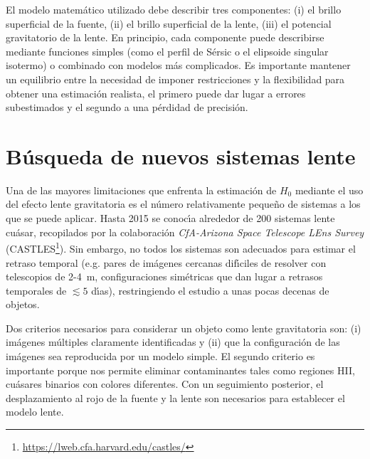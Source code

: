 \documentclass[baaa]{baaa}
\begin{document}
El modelo matem\'atico utilizado debe describir tres componentes: (i) el brillo superficial de la fuente, (ii) el brillo superficial de la lente, (iii) el potencial gravitatorio de la lente. En principio, cada componente puede describirse mediante funciones simples (como el perfil de S\'ersic o el elipsoide singular isotermo) o combinado con modelos m\'as complicados.  
Es importante mantener un equilibrio entre la necesidad de imponer restricciones y la flexibilidad para obtener una estimaci\'on realista, el primero puede dar lugar a errores subestimados y el segundo a una p\'erdidad de precisi\'on.



\section{B\'usqueda de nuevos sistemas lente}

Una de las mayores limitaciones que enfrenta la estimaci\'on de $H_0$ mediante el uso del efecto lente gravitatoria es el n\'umero relativamente peque\~no de sistemas a los que se puede aplicar. Hasta 2015 se conoc\'{\i}a alrededor de 200 sistemas lente cu\'asar, recopilados por la colaboraci\'on {\em CfA-Arizona Space Telescope LEns Survey} (CASTLES\footnote{\url{https://lweb.cfa.harvard.edu/castles/}}). Sin embargo, no todos los sistemas son adecuados para estimar el retraso temporal (e.g. pares de im\'agenes cercanas dif\'{\i}ciles de resolver con telescopios de 2-4~m, configuraciones sim\'etricas que dan lugar a retrasos temporales de $\lesssim 5$ d\'{\i}as), restringiendo el estudio a unas pocas decenas de objetos. 

Dos criterios necesarios para considerar un objeto como lente gravitatoria son: (i) im\'agenes m\'ultiples claramente identificadas y (ii) que la configuraci\'on de las im\'agenes sea reproducida por un modelo simple. El segundo criterio es importante porque nos permite eliminar contaminantes tales como regiones HII, cu\'asares binarios con colores diferentes.  Con un seguimiento posterior, el desplazamiento al rojo de la fuente y la lente son necesarios para establecer el modelo lente.
\end{document}
